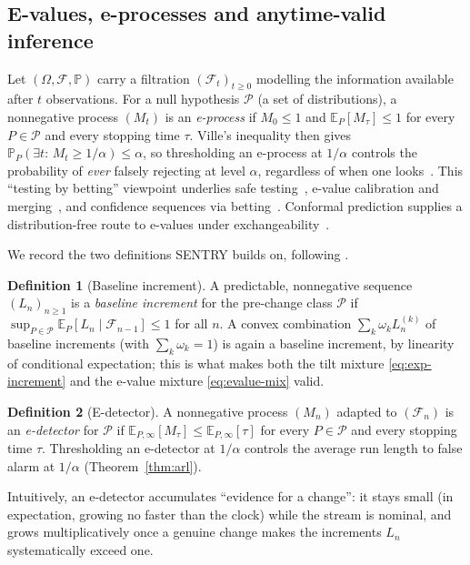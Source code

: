 \documentclass[10pt,journal,compsoc]{IEEEtran}
\theoremstyle{plain}
\theoremstyle{definition}
\newtheorem{definition}{Definition}
\newcommand{\Ecal}{\mathbb{E}}
\newcommand{\Pcal}{\mathcal{P}}
\newcommand{\Fcal}{\mathcal{F}}
\newcommand{\Prob}{\mathbb{P}}
\begin{document}
\subsection{E-values, e-processes and anytime-valid inference}

Let \((\Omega,\Fcal,\Prob)\) carry a filtration \((\Fcal_t)_{t\ge 0}\)
modelling the information available after \(t\) observations. For a null
hypothesis \(\Pcal\) (a set of distributions), a nonnegative process
\((M_t)\) is an \emph{e-process} if \(M_0\le 1\) and \(\Ecal_P[M_\tau]\le 1\)
for every \(P\in\Pcal\) and every stopping time \(\tau\). Ville's inequality
then gives \(\Prob_P(\exists t:\, M_t \ge 1/\alpha)\le\alpha\), so
thresholding an e-process at \(1/\alpha\) controls the probability of \emph{ever}
falsely rejecting at level \(\alpha\), regardless of when one
looks~\cite{ramdas2023gametheoretic}. This ``testing by betting'' viewpoint
underlies safe testing~\cite{grunwald2024safetesting}, e-value
calibration and merging~\cite{vovk2021evalues}, and confidence sequences via
betting~\cite{waudbysmith2023betting}. Conformal prediction supplies a
distribution-free route to e-values under
exchangeability~\cite{vovk2022algorithmic}.

We record the two definitions SENTRY builds on, following
\cite{shin2023edetectors}.

\begin{definition}[Baseline increment]\label{def:increment}
A predictable, nonnegative sequence \((L_n)_{n\ge 1}\) is a \emph{baseline
increment} for the pre-change class \(\Pcal\) if
\(\sup_{P\in\Pcal}\Ecal_{P}[L_n\mid\Fcal_{n-1}]\le 1\) for all \(n\). A convex
combination \(\sum_k\omega_k L_n^{(k)}\) of baseline increments (with
\(\sum_k\omega_k=1\)) is again a baseline increment, by linearity of
conditional expectation; this is what makes both the tilt mixture
\eqref{eq:exp-increment} and the e-value mixture \eqref{eq:evalue-mix} valid.
\end{definition}

\begin{definition}[E-detector]\label{def:edetector}
A nonnegative process \((M_n)\) adapted to \((\Fcal_n)\) is an
\emph{e-detector} for \(\Pcal\) if \(\Ecal_{P,\infty}[M_\tau]\le
\Ecal_{P,\infty}[\tau]\) for every \(P\in\Pcal\) and every stopping time
\(\tau\). Thresholding an e-detector at \(1/\alpha\) controls the average run
length to false alarm at \(1/\alpha\) (Theorem~\ref{thm:arl}).
\end{definition}

Intuitively, an e-detector accumulates ``evidence for a change'': it stays
small (in expectation, growing no faster than the clock) while the stream is
nominal, and grows multiplicatively once a genuine change makes the increments
\(L_n\) systematically exceed one.
\end{document}
